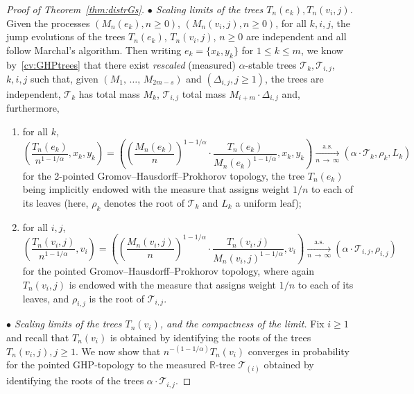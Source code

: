 \documentclass[AHL,Unicode,longabstracts,published]{cedram}
\newcommand{\cT}{\mathcal{T}}
\newcommand{\R}{\mathbb{R}}
\newcommand*{\alphenumi}{\renewcommand*{\theenumi}{\alph{enumi}}}
\newcommand{\R}{\mathbb{R}}
\begin{document}
\begin{proof}[Proof of Theorem~\ref{thm:distrGs}]
\emph{$\bullet$ Scaling limits of the trees $T_n(e_k),T_{n}(v_{i},j)$.} Given the processes $(M_n(e_k),n\geq 0)$, $(M_{n}(v_{i},j), n \geq 0)$, for all $k,i,j$, the jump evolutions of the trees $T_n(e_k)$, $T_{n}(v_{i},j)$, $n \geq 0$ are independent and all follow Marchal's algorithm. Then writing $e_k=\{x_k,y_k\}$ for $1\leq k \leq m$, we know by~\eqref{cv:GHPtrees} that there exist \emph{rescaled} (measured) $\alpha$-stable trees $\cT_k,\cT_{i,j}$, $k,i,j$ such that, given $(M_1,\,\ldots,\,M_{2m-s})$ and $(\Delta_{i,j},j\geq 1)$, the trees are independent, $\cT_k$ has total mass $M_k$, $\cT_{i,j}$ total mass $M_{i+m} \cdot \Delta_{i,j}$ and, furthermore,
\begin{enumerate}\alphenumi
\item\label{prooftheo1.6.a} for all $k$,
\[
\left(\frac{T_n(e_k)}{n^{1-1/\alpha}},x_k,y_k\right)=\left(\left(\frac{M_n(e_k)}{n}\right)^{1-1/\alpha} \cdot\frac{T_n(e_k)}{M_n(e_k)^{1-1/\alpha}},x_k,y_k\right) \underset{n\,\rightarrow\, \infty}{\overset{\text{a.s.}}\longrightarrow}\left(\alpha \cdot \cT_k,\rho_k,L_k\right)
\]
for the 2-pointed Gromov--Hausdorff--Prokhorov topology, the tree $T_n(e_k)$ being implicitly endowed with the measure that assigns weight $1/n$ to each of its leaves (here, $\rho_k$ denotes the root of $\cT_k$ and $L_k$ a uniform leaf);

\item\label{prooftheo1.6.b} for all $i,j$,
\[
\left(\frac{T_{n}(v_{i},j)}{n^{1-1/\alpha}},v_i\right)=\left(\left(\frac{M_{n}\left(v_{i},j\right)}{n} \right)^{1-1/\alpha}\cdot \frac{T_{n}\left(v_{i},j\right)}{M_{n}\left(v_{i},j\right)^{1-1/\alpha}},v_i \right)\underset{n \,\rightarrow\,\infty}{\overset{\text{a.s.}}\longrightarrow} \left(\alpha \cdot \cT_{i,j},\rho_{i,j} \right)
\]
for the pointed Gromov--Hausdorff--Prokhorov topology, where again $T_{n}(v_{i},j)$ is endowed with the measure that assigns weight $1/n$ to each of its leaves, and $\rho_{i,j}$ is the root of $\cT_{i,j}$.
\end{enumerate}


\emph{$\bullet$ Scaling limits of the trees $T_n(v_{i})$, and the compactness of the limit.}
Fix $i \ge 1$ and recall that $T_n(v_{i})$ is obtained by identifying the roots of the trees $T_{n}(v_{i},j),j\geq 1$. We now show that $n^{-(1-1/\alpha)} T_n(v_i)$ converges in probability for the pointed GHP-topology to the measured $\R$-tree $\cT_{(i)}$ obtained by identifying the roots of the trees $\alpha \cdot \cT_{i,j}$.


\end{proof}
\end{document}
